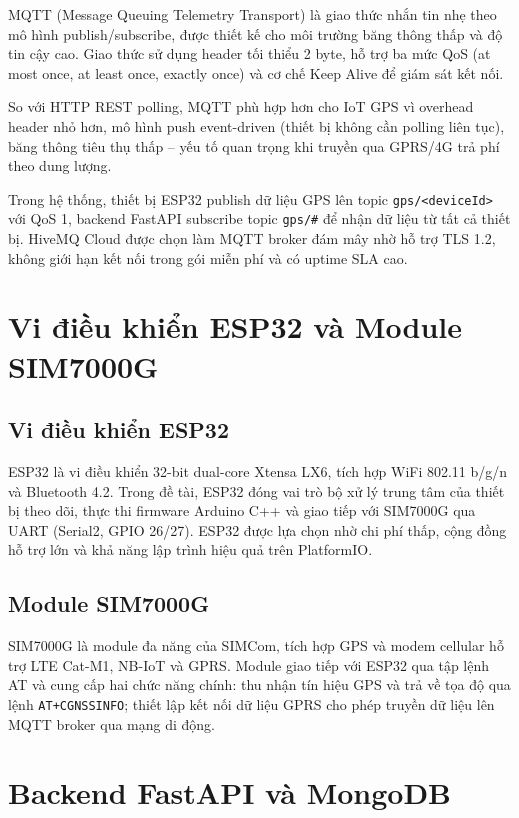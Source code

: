 \documentclass[../DoAn.tex]{subfiles}
\begin{document}
MQTT (Message Queuing Telemetry Transport) là giao thức nhắn tin nhẹ theo mô hình publish/subscribe, được thiết kế cho môi trường băng thông thấp và độ tin cậy cao. Giao thức sử dụng header tối thiểu 2 byte, hỗ trợ ba mức QoS (at most once, at least once, exactly once) và cơ chế Keep Alive để giám sát kết nối.

So với HTTP REST polling, MQTT phù hợp hơn cho IoT GPS vì overhead header nhỏ hơn, mô hình push event-driven (thiết bị không cần polling liên tục), băng thông tiêu thụ thấp -- yếu tố quan trọng khi truyền qua GPRS/4G trả phí theo dung lượng.

Trong hệ thống, thiết bị ESP32 publish dữ liệu GPS lên topic \texttt{gps/<deviceId>} với QoS 1, backend FastAPI subscribe topic \texttt{gps/\#} để nhận dữ liệu từ tất cả thiết bị. HiveMQ Cloud được chọn làm MQTT broker đám mây nhờ hỗ trợ TLS 1.2, không giới hạn kết nối trong gói miễn phí và có uptime SLA cao.

\section{Vi điều khiển ESP32 và Module SIM7000G}

\subsection{Vi điều khiển ESP32}

ESP32 là vi điều khiển 32-bit dual-core Xtensa LX6, tích hợp WiFi 802.11 b/g/n và Bluetooth 4.2. Trong đề tài, ESP32 đóng vai trò bộ xử lý trung tâm của thiết bị theo dõi, thực thi firmware Arduino C++ và giao tiếp với SIM7000G qua UART (Serial2, GPIO 26/27). ESP32 được lựa chọn nhờ chi phí thấp, cộng đồng hỗ trợ lớn và khả năng lập trình hiệu quả trên PlatformIO.

\subsection{Module SIM7000G}

SIM7000G là module đa năng của SIMCom, tích hợp GPS và modem cellular hỗ trợ LTE Cat-M1, NB-IoT và GPRS. Module giao tiếp với ESP32 qua tập lệnh AT và cung cấp hai chức năng chính: thu nhận tín hiệu GPS và trả về tọa độ qua lệnh \texttt{AT+CGNSSINFO}; thiết lập kết nối dữ liệu GPRS cho phép truyền dữ liệu lên MQTT broker qua mạng di động.

\section{Backend FastAPI và MongoDB}
\end{document}
